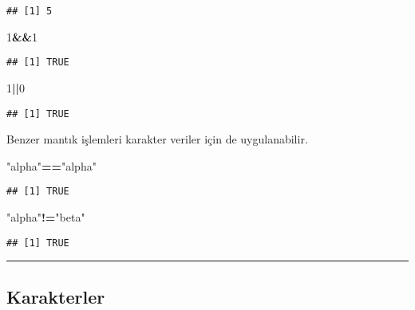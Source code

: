 \documentclass[
]{book}
\newenvironment{Shaded}{\begin{snugshade}}{\end{snugshade}}
\newcommand{\DecValTok}[1]{\textcolor[rgb]{0.00,0.00,0.81}{#1}}
\newcommand{\OperatorTok}[1]{\textcolor[rgb]{0.81,0.36,0.00}{\textbf{#1}}}
\newcommand{\StringTok}[1]{\textcolor[rgb]{0.31,0.60,0.02}{#1}}
\begin{document}
\begin{verbatim}
## [1] 5
\end{verbatim}

\begin{Shaded}
\begin{Highlighting}[]
\DecValTok{1}\OperatorTok{&&}\DecValTok{1}
\end{Highlighting}
\end{Shaded}

\begin{verbatim}
## [1] TRUE
\end{verbatim}

\begin{Shaded}
\begin{Highlighting}[]
\DecValTok{1}\OperatorTok{||}\DecValTok{0}
\end{Highlighting}
\end{Shaded}

\begin{verbatim}
## [1] TRUE
\end{verbatim}

Benzer mantık işlemleri karakter veriler için de uygulanabilir.

\begin{Shaded}
\begin{Highlighting}[]
\StringTok{"alpha"}\OperatorTok{==}\StringTok{"alpha"}
\end{Highlighting}
\end{Shaded}

\begin{verbatim}
## [1] TRUE
\end{verbatim}

\begin{Shaded}
\begin{Highlighting}[]
\StringTok{"alpha"}\OperatorTok{!=}\StringTok{"beta"}
\end{Highlighting}
\end{Shaded}

\begin{verbatim}
## [1] TRUE
\end{verbatim}

\begin{center}\rule{0.5\linewidth}{0.5pt}\end{center}

\hypertarget{karakterler}{%
\subsection{Karakterler}\label{karakterler}}
\end{document}
